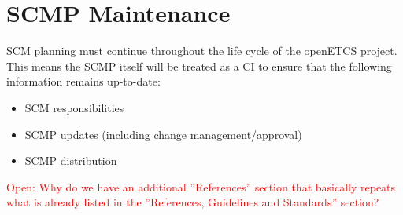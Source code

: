 \documentclass{template/openetcs_article}
\begin{document}
\newpage


\section{SCMP Maintenance} %
\label{sec:SCMP Maintenance}

SCM planning must continue throughout the life cycle of the openETCS project. This means the SCMP itself will be treated as a CI to ensure that the following information remains up-to-date:

\vspace{-10pt}
\begin{itemize}
\item SCM responsibilities
\item SCMP updates (including change management/approval)
\item SCMP distribution
\end{itemize}

\newpage




\textcolor{red}{Open: Why do we have an additional ''References'' section that basically repeats what is already listed in the ''References, Guidelines and Standards'' section?}


\end{document}
